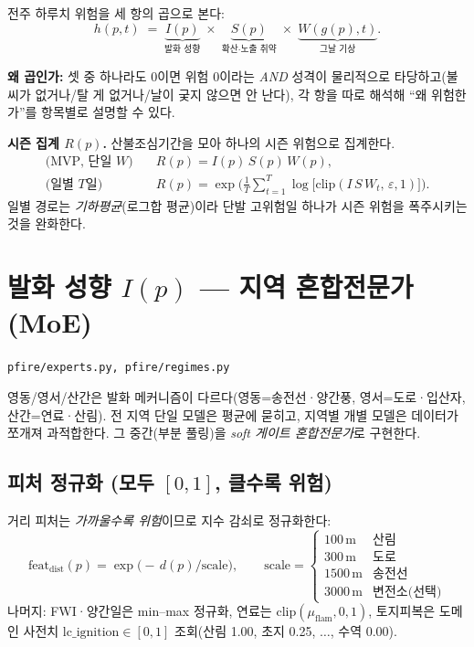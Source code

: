 \documentclass[11pt,a4paper]{article}
\newcommand{\src}[1]{{\footnotesize\color{gray}\texttt{#1}}}
\begin{document}
전주 하루치 위험을 세 항의 곱으로 본다:
\begin{equation}
h(p,t)\;=\;\underbrace{I(p)}_{\text{발화 성향}}\;\times\;
\underbrace{S(p)}_{\text{확산·노출 취약}}\;\times\;
\underbrace{W(g(p),t)}_{\text{그날 기상}}.
\end{equation}

\textbf{왜 곱인가:} 셋 중 하나라도 0이면 위험 0이라는 \emph{AND} 성격이 물리적으로
타당하고(불씨가 없거나/탈 게 없거나/날이 궂지 않으면 안 난다), 각 항을 따로 해석해
``왜 위험한가''를 항목별로 설명할 수 있다.

\textbf{시즌 집계 $R(p)$.} 산불조심기간을 모아 하나의 시즌 위험으로 집계한다.
\begin{align}
\text{(MVP, 단일 } W)\quad & R(p)=I(p)\,S(p)\,W(p),\\
\text{(일별 } T\text{일)}\quad & R(p)=\exp\!\Big(\tfrac{1}{T}\textstyle\sum_{t=1}^{T}
\log\big[\mathrm{clip}(I\,S\,W_t,\,\varepsilon,1)\big]\Big).
\end{align}
일별 경로는 \emph{기하평균}(로그합 평균)이라 단발 고위험일 하나가 시즌 위험을 폭주시키는
것을 완화한다.

\section{발화 성향 $I(p)$ — 지역 혼합전문가(MoE)}
\src{pfire/experts.py, pfire/regimes.py}

영동/영서/산간은 발화 메커니즘이 다르다(영동=송전선·양간풍, 영서=도로·입산자,
산간=연료·산림). 전 지역 단일 모델은 평균에 묻히고, 지역별 개별 모델은 데이터가 쪼개져
과적합한다. 그 중간(부분 풀링)을 \emph{soft 게이트 혼합전문가}로 구현한다.

\subsection{피처 정규화 (모두 $[0,1]$, 클수록 위험)}
거리 피처는 \emph{가까울수록 위험}이므로 지수 감쇠로 정규화한다:
\begin{equation}
\mathrm{feat}_{\text{dist}}(p)=\exp\!\big(-\,d(p)/\text{scale}\big),\qquad
\text{scale}=\begin{cases}
100\,\text{m} & \text{산림}\\
300\,\text{m} & \text{도로}\\
1500\,\text{m} & \text{송전선}\\
3000\,\text{m} & \text{변전소(선택)}
\end{cases}
\end{equation}
나머지: FWI·양간일은 min--max 정규화, 연료는 $\mathrm{clip}(\mu_{\text{flam}},0,1)$,
토지피복은 도메인 사전치 $\mathrm{lc\_ignition}\in[0,1]$ 조회(산림 1.00, 초지 0.25,
$\dots$, 수역 0.00).
\end{document}
